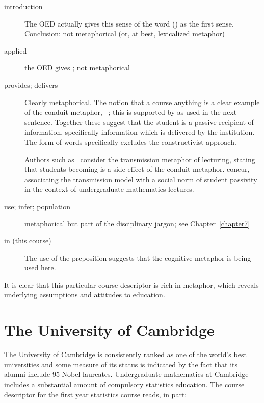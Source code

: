 \begin{description}
\item[introduction] The OED actually gives this sense of the word
  () as the first sense.
  Conclusion: not metaphorical (or, at best, lexicalized metaphor)
\item[applied] the OED gives ; not
  metaphorical
\item[provides; delivers] Clearly metaphorical.  The notion that a
  course  anything is a clear example of the
  conduit metaphor, ~\citep{reddy1993}; this is supported by
   as used in the next sentence.  Together these
  suggest that the student is a passive recipient of information,
  specifically information which is delivered by the institution.  The
  form of words specifically excludes the constructivist approach.

  Authors such as~ consider the transmission
  metaphor of lecturing, stating that students becoming
   is a
  side-effect of the conduit metaphor.   concur,
  associating the transmission model with a social norm of student
  passivity in the context of undergraduate mathematics lectures.
\item[use; infer; population] metaphorical but part of the
  disciplinary jargon; see Chapter~\ref{chapter7}
\item[in (this course)] The use of the preposition 
  suggests that the cognitive metaphor 
  is being used here.
\end{description}

It is clear that this particular course descriptor is rich in
metaphor, which reveals underlying assumptions and attitudes to
education.

\section{The University of Cambridge}

The University of Cambridge is consistently ranked as one of the
world's best universities and some measure of its status is indicated
by the fact that its alumni include 95 Nobel laureates.  Undergraduate
mathematics at Cambridge includes a substantial amount of compulsory
statistics education.  The course descriptor for the first year
statistics course reads, in part:


